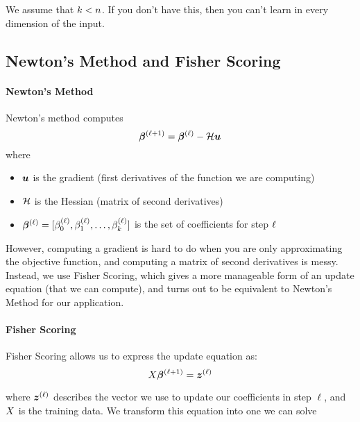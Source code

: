 We assume that $k < n$. If you don't have this, then you can't learn in every dimension of the input.


\subsection{Newton's Method and Fisher Scoring}

\paragraph{Newton's Method}

Newton's method computes
\begin{equation}
	\coefficients{\step+1} = \coefficients{\step} - \hessian \gradient
\end{equation}
where
\begin{itemize}
	\item $\gradient$ is the gradient (first derivatives of the function we are computing)
	\item $\mathcal{H}$ is the Hessian (matrix of second derivatives)
	\item $\coefficients{\step} = [ \coeff_{0}^{(\step)}, \coeff_{1}^{(\step)},\ldots, \coeff_{\featurelen}^{(\step)} ]$ is the set of coefficients for step $\ell$
\end{itemize}

However, computing a gradient is hard to do when you are only approximating the objective function, and computing a matrix of second derivatives is messy. Instead, we use Fisher Scoring, which gives a more manageable form of an update equation (that we can compute), and turns out to be equivalent to Newton's Method for our application.

\paragraph{Fisher Scoring}
Fisher Scoring allows us to express the update equation as:
\begin{equation}
	\xdata\coefficients{\step+1} = \updatevector{\step}
\end{equation}

where $\updatevector{\step}$ describes the vector we use to update our coefficients in step $\ell$, and $X$ is the training data. We transform this equation into one we can solve

